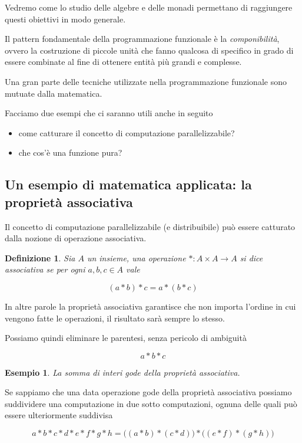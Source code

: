 \documentclass[12pt]{article}
\newtheorem{definition}{Definizione}
\newtheorem{example}{Esempio}
\begin{document}
Vedremo come lo studio delle algebre e delle monadi permettano di raggiungere questi obiettivi in modo generale.

Il pattern fondamentale della programmazione funzionale è la \emph{componibilità}, ovvero la costruzione di piccole unità
che fanno qualcosa di specifico in grado di essere combinate al fine di ottenere entità più grandi e complesse.

Una gran parte delle tecniche utilizzate nella programmazione funzionale sono mutuate dalla matematica.

Facciamo due esempi che ci saranno utili anche in seguito

\begin{itemize}
  \item come catturare il concetto di computazione parallelizzabile?
  \item che cos'è una funzione pura?
\end{itemize}

\subsection{Un esempio di matematica applicata: la proprietà associativa}

Il concetto di computazione parallelizzabile (e distribuibile) può essere catturato dalla nozione di operazione associativa.

\begin{definition}
Sia $A$ un insieme, una operazione $*: A \times A \rightarrow A$ si dice \emph{associativa} se per ogni $a, b, c \in A$ vale

$$
(a * b) * c = a * ( b * c )
$$
\end{definition}

In altre parole la proprietà associativa garantisce che non importa l'ordine in cui vengono fatte le operazioni, il risultato sarà sempre lo stesso.

Possiamo quindi eliminare le parentesi, senza pericolo di ambiguità

$$
a * b * c
$$

\begin{example}
La somma di interi gode della proprietà associativa.
\end{example}

Se sappiamo che una data operazione gode della proprietà associativa possiamo suddividere una computazione in due sotto computazioni, ognuna delle quali può essere ulteriormente suddivisa

$$
a * b * c * d * e * f * g * h = \Big( ( a * b ) * ( c * d ) \Big) * \Big( ( e * f ) * ( g * h ) \Big)
$$
\end{document}

